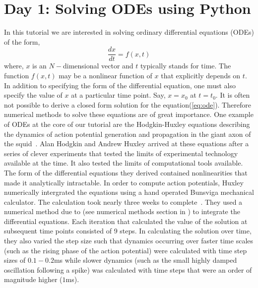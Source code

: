 \documentclass[10pt,letterpaper]{article}
\begin{document}

\section*{Day 1: Solving ODEs using Python}
In this tutorial we are interested in solving ordinary differential equations (ODEs) of the form,
\begin{equation}
\frac{dx}{dt} = f(x, t)
\label{eq:ode}
\end{equation}
where, $x$ is an $N-$dimensional vector and $t$ typically stands for time. The function $f(x,t)$ may be a nonlinear function of $x$ that explicitly depends on $t$. In addition to specifying the form of the differential equation, one must also specify the value of $x$ at a particular time point. Say, $x=x_{0}$ at $t = t_0$. It is often not possible to derive a closed form solution for the equation(\ref{eq:ode}). Therefore numerical methods to solve these equations are of great importance. One example of ODEs at the core of our tutorial are the Hodgkin-Huxley equations describing the dynamics of action potential generation and propagation in the giant axon of the squid~\cite{Huxley1952}. Alan Hodgkin and Andrew Huxley arrived at these equations after a series of clever experiments that tested the limits of experimental technology available at the time. It also tested the limits of computational tools available. The form of the differential equations they derived contained nonlinearities that made it analytically intractable. In order to compute action potentials, Huxley numerically intergrated the equations using a hand operated Bunsviga mechanical calculator. The calculation took nearly three weeks to complete~\cite{Hodgkin1976}. They used a numerical method due to (see numerical methods section in \cite{Hodgkin1976}) to integrate the differential equations. Each iteration that calculated the value of the solution at subsequent time points consisted of 9 steps. In calculating the solution over time, they also varied the step size such that dynamics occurring over faster time scales (such as the rising phase of the action potential) were calculated with time step sizes of $0.1-0.2$ms while slower dynamics (such as the small highly damped oscillation following a spike) was calculated with time steps that were an order of magnitude higher ($1$ms).
\end{document}
